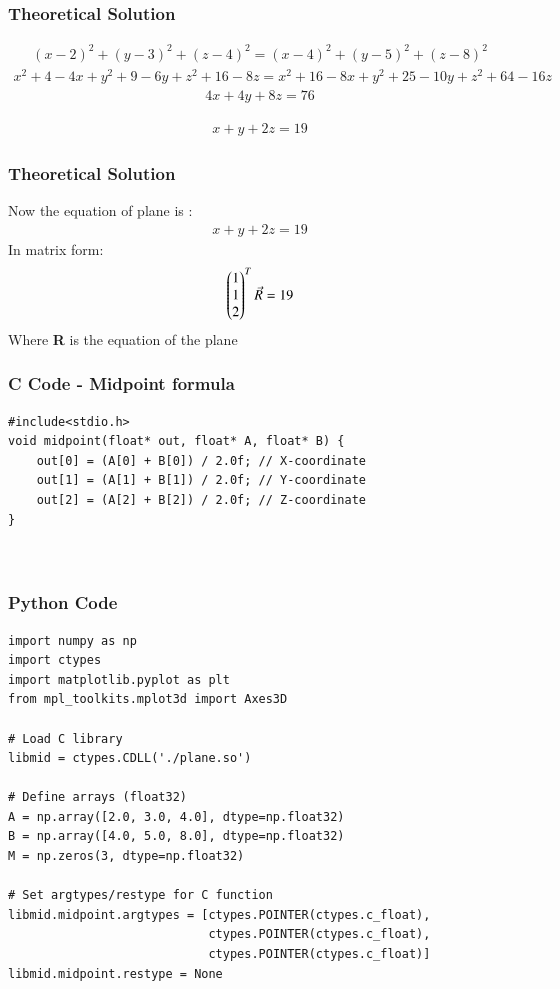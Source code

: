 \documentclass{beamer}
\begin{document}
\begin{frame}
\frametitle{Theoretical Solution}
\begin{align}
(x-2)^2+(y-3)^2+(z-4)^2=(x-4)^2+(y-5)^2+(z-8)^2
\end{align}
\begin{align}
    x^2+4-4x+y^2+9-6y+z^2+16-8z=x^2+16-8x+y^2+25-10y+z^2+64-16z
\end{align}
\begin{align}
   4x+4y+8z=76
\end{align}

\begin{align}
     x+y+2z=19
\end{align}


\end{frame}
\begin{frame}
\frametitle{Theoretical Solution}
Now the equation of plane is :
\begin{align}
     x+y+2z=19
\end{align}
In matrix form:
\begin{align}
     \begin{pmatrix}1\\1\\2\end{pmatrix}^T\Vec{R}=19
\end{align}
Where \textbf{R} is the equation of the plane


\end{frame}




\begin{frame}[fragile]
    \frametitle{C Code - Midpoint formula }

    \begin{lstlisting}
#include<stdio.h>
void midpoint(float* out, float* A, float* B) {
    out[0] = (A[0] + B[0]) / 2.0f; // X-coordinate
    out[1] = (A[1] + B[1]) / 2.0f; // Y-coordinate
    out[2] = (A[2] + B[2]) / 2.0f; // Z-coordinate
}



    \end{lstlisting}
\end{frame}


\begin{frame}[fragile]
    \frametitle{Python Code}
    \begin{lstlisting}
import numpy as np
import ctypes
import matplotlib.pyplot as plt
from mpl_toolkits.mplot3d import Axes3D

# Load C library
libmid = ctypes.CDLL('./plane.so')

# Define arrays (float32)
A = np.array([2.0, 3.0, 4.0], dtype=np.float32)
B = np.array([4.0, 5.0, 8.0], dtype=np.float32)
M = np.zeros(3, dtype=np.float32)

# Set argtypes/restype for C function
libmid.midpoint.argtypes = [ctypes.POINTER(ctypes.c_float),
                            ctypes.POINTER(ctypes.c_float),
                            ctypes.POINTER(ctypes.c_float)]
libmid.midpoint.restype = None







    \end{lstlisting}
\end{frame}
\end{document}
